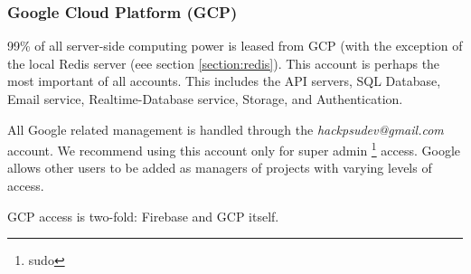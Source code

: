 \documentclass[twoside, 12pt]{article}
\begin{document}
\subsubsection{Google Cloud Platform (GCP)}
\par 99\% of all server-side computing power is leased from GCP (with the exception of the local Redis server (eee section \ref{section:redis}). This account is perhaps the most important of all accounts. This includes the API servers, SQL Database, Email service, Realtime-Database service, Storage, and Authentication.
\par All Google related management is handled through the \textit{hackpsudev@gmail.com} account. We recommend using this account only for super admin \footnote{sudo} access. Google allows other users to be added as managers of projects with varying levels of access. 
\par GCP access is two-fold: Firebase and GCP itself.
\end{document}
